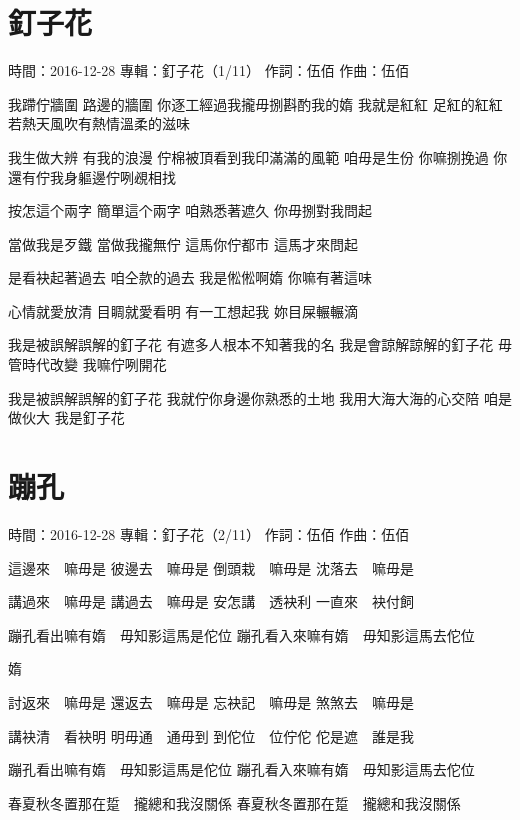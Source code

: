 \documentclass[UTF8,a4paper,oneside,twocolumn,12pt]{ctexbook}
\newcommand{\infopair}[2]{\textbullet #1：#2}
\newcommand{\zc}[1][伍佰]{\infopair{作詞}{#1}}
\newcommand{\zq}[1][伍佰]{\infopair{作曲}{#1}}
\newcommand{\zj}[1]{\infopair{專輯}{#1}}
\newcommand{\sj}[1]{\infopair{時間}{#1}}
\newenvironment{info}{\begin{flushleft}\kaishu
	}
	{\end{flushleft}\normalsize\yahei\par}
\newenvironment{lyric}{
	}
{}
\begin{document}
\section{釘子花}
\begin{info}
	\sj{2016-12-28}
	\zj{釘子花（1/11）}
	\zc
	\zq
\end{info}
\begin{lyric}
	我蹛佇牆圍 路邊的牆圍
	你逐工經過我攏毋捌斟酌我的媠
	我就是紅紅 足紅的紅紅
	若熱天風吹有熱情溫柔的滋味

	我生做大辨 有我的浪漫
	佇棉被頂看到我印滿滿的風範
	咱毋是生份 你嘛捌挽過
	你還有佇我身軀邊佇咧覕相找

	按怎這个兩字 簡單這个兩字
	咱熟悉著遮久 你毋捌對我問起

	當做我是歹鐵 當做我攏無佇
	這馬你佇都市 這馬才來問起

	是看袂起著過去 咱仝款的過去
	我是倯倯啊媠 你嘛有著這味

	心情就愛放清 目睭就愛看明
	有一工想起我 妳目屎輾輾滴

	我是被誤解誤解的釘子花
	有遮多人根本不知著我的名
	我是會諒解諒解的釘子花
	毋管時代改變 我嘛佇咧開花

	我是被誤解誤解的釘子花
	我就佇你身邊你熟悉的土地
	我用大海大海的心交陪
	咱是做伙大 我是釘子花
\end{lyric}

\section{蹦孔}
\begin{info}
	\sj{2016-12-28}
	\zj{釘子花（2/11）}
	\zc
	\zq
\end{info}
\begin{lyric}
	這邊來　嘛毋是
	彼邊去　嘛毋是
	倒頭栽　嘛毋是
	沈落去　嘛毋是

	講過來　嘛毋是
	講過去　嘛毋是
	安怎講　透袂利
	一直來　袂付飼

	蹦孔看出嘛有媠　毋知影這馬是佗位
	蹦孔看入來嘛有媠　毋知影這馬去佗位

	媠

	討返來　嘛毋是
	還返去　嘛毋是
	忘袂記　嘛毋是
	煞煞去　嘛毋是

	講袂清　看袂明
	明毋通　通毋到
	到佗位　位佇佗
	佗是遮　誰是我

	蹦孔看出嘛有媠　毋知影這馬是佗位
	蹦孔看入來嘛有媠　毋知影這馬去佗位

	春夏秋冬置那在踅　攏總和我沒關係
	春夏秋冬置那在踅　攏總和我沒關係
\end{lyric}
\end{document}
